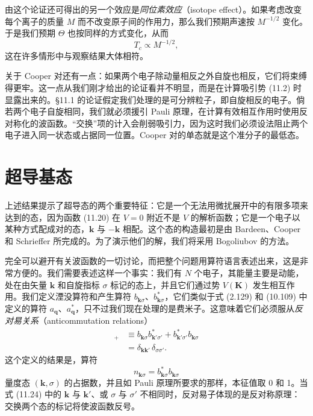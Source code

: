 由这个论证还可得出的另一个效应是\emph{同位素效应}（isotope effect）。如果考虑改变每个离子的质量 $M$ 而不改变原子间的作用力，那么我们预期声速按 $M^{-1/2}$ 变化。于是我们预期 $\Theta$ 也按同样的方式变化，从而
\begin{equation*}
T_{c}\propto M^{-1/2},
\tag{11.23}
\end{equation*}
这在许多情形中与观察结果大体相符。

关于 Cooper 对还有一点：如果两个电子除动量相反之外自旋也相反，它们将束缚得更牢。这一点从我们刚才给出的论证看并不明显，而是在计算吸引势 (11.2) 时显露出来的。§11.1 的论证假定我们处理的是可分辨粒子，即自旋相反的电子。倘若两个电子自旋相同，我们就必须援引 Pauli 原理，在计算有效相互作用时使用反对称化的波函数。“交换”项的计入会削弱吸引力，因为这时我们必须设法阻止两个电子进入同一状态或占据同一位置。Cooper 对的单态就是这个准分子的最低态。

\section{超导基态}

上述结果提示了超导态的两个重要特征：它是一个无法用微扰展开中的有限多项来达到的态，因为函数 (11.20) 在 $V=0$ 附近不是 $V$ 的解析函数；它是一个电子以某种方式配成对的态，$\mathbf{k}$ 与 $-\mathbf{k}$ 相配。这个态的构造最初是由 Bardeen、Cooper 和 Schrieffer 所完成的。为了演示他们的解，我们将采用 Bogoliubov 的方法。

完全可以避开有关波函数的一切讨论，而把整个问题用算符语言表述出来，这是非常方便的。我们需要表述这样一个事实：我们有 $N$ 个电子，其能量主要是动能，处在由矢量 $\mathbf{k}$ 和自旋指标 $\sigma$ 标记的态上，并且它们通过势 $V(\mathbf{K})$ 发生相互作用。我们定义湮没算符和产生算符 $b_{\mathbf{k}\sigma}$、$b^{*}_{\mathbf{k}\sigma}$，它们类似于式 (2.129) 和 (10.109) 中定义的算符 $a_{\mathbf{q}}$、$a^{*}_{\mathbf{q}}$，只不过我们现在处理的是费米子。这意味着它们必须服从\emph{反对易关系}（anticommutation relations）
\begin{align*}
[b_{\mathbf{k}\sigma},\,b^{*}_{\mathbf{k}'\sigma'}]_{+} &\equiv b_{\mathbf{k}\sigma}b^{*}_{\mathbf{k}'\sigma'}+b^{*}_{\mathbf{k}'\sigma'}b_{\mathbf{k}\sigma}\\
&=\delta_{\mathbf{k}\mathbf{k}'}\,\delta_{\sigma\sigma'}.
\tag{11.24}
\end{align*}
这个定义的结果是，算符
\begin{equation*}
n_{\mathbf{k}\sigma}=b^{*}_{\mathbf{k}\sigma}b_{\mathbf{k}\sigma}
\tag{11.25}
\end{equation*}
量度态 $(\mathbf{k},\sigma)$ 的占据数，并且如 Pauli 原理所要求的那样，本征值取 0 和 1。当式 (11.24) 中的 $\mathbf{k}$ 与 $\mathbf{k}'$、或 $\sigma$ 与 $\sigma'$ 不相同时，反对易子体现的是反对称原理：交换两个态的标记将使波函数反号。

